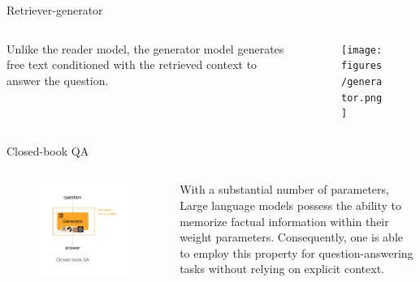 \documentclass{beamer}
\begin{document}
\begin{frame}{Retriever-generator}
    \begin{columns}
        \begin{column}{0.55\textwidth}
            Unlike the reader model, the generator model generates free text conditioned with the retrieved context to answer the question.
        \end{column}
        
        \begin{column}{0.45\textwidth}
            \begin{figure}[htbp]
                \centering
                \texttt{[image: figures/generator.png]}
            \end{figure}
        \end{column}
    \end{columns}
\end{frame}

\begin{frame}{Closed-book QA}
    \begin{columns}
        \begin{column}{0.45\textwidth}
            \begin{figure}[htbp]
                \centering
                \includegraphics[width=\textwidth]{figures/closedbook.png}
            \end{figure}
        \end{column}

        \begin{column}{0.55\textwidth}
            With a substantial number of parameters, Large language models possess the ability to memorize factual information within their weight parameters. 
            Consequently, one is able to employ this property for question-answering tasks without relying on explicit context.             
        \end{column}
    \end{columns}
\end{frame}
\end{document}
